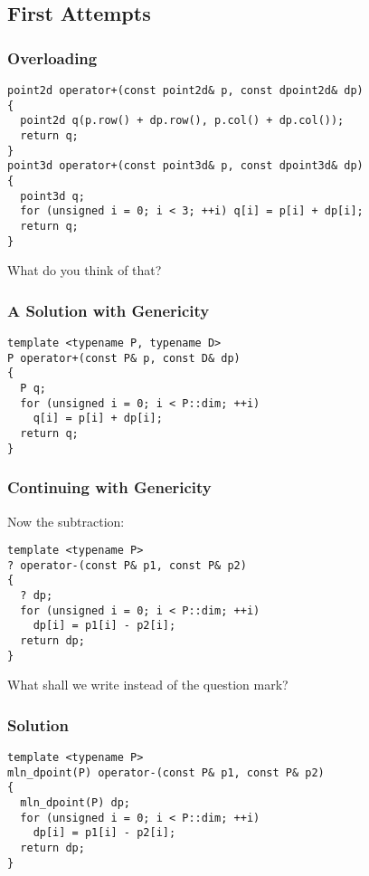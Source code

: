 \documentclass{beamer}
\begin{document}
\subsection{First Attempts}


\begin{frame}[fragile]
  \frametitle{Overloading}

\begin{lstlisting}
point2d operator+(const point2d& p, const dpoint2d& dp)
{
  point2d q(p.row() + dp.row(), p.col() + dp.col());
  return q;
}
point3d operator+(const point3d& p, const dpoint3d& dp)
{
  point3d q;
  for (unsigned i = 0; i < 3; ++i) q[i] = p[i] + dp[i];
  return q;
}
\end{lstlisting}

What do you think of that?

\end{frame}



\begin{frame}[fragile]
  \frametitle{A Solution with Genericity}

\begin{lstlisting}
template <typename P, typename D>
P operator+(const P& p, const D& dp)
{
  P q;
  for (unsigned i = 0; i < P::dim; ++i)
    q[i] = p[i] + dp[i];
  return q;
}
\end{lstlisting}

\end{frame}


\begin{frame}[fragile]
  \frametitle{Continuing with Genericity}

Now the subtraction:

\begin{lstlisting}
template <typename P>
? operator-(const P& p1, const P& p2)
{
  ? dp;
  for (unsigned i = 0; i < P::dim; ++i)
    dp[i] = p1[i] - p2[i];
  return dp;
}
\end{lstlisting}

What shall we write instead of the question mark?

\end{frame}


\begin{frame}[fragile]
  \frametitle{Solution}

\begin{lstlisting}
template <typename P>
mln_dpoint(P) operator-(const P& p1, const P& p2)
{
  mln_dpoint(P) dp;
  for (unsigned i = 0; i < P::dim; ++i)
    dp[i] = p1[i] - p2[i];
  return dp;
}
\end{lstlisting}

\end{frame}
\end{document}
